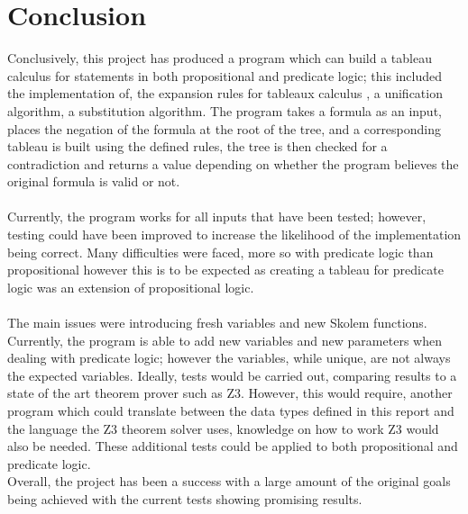 \documentclass{article}%
\begin{document}
\section{Conclusion}
Conclusively, this project has produced a program which can build a tableau calculus for statements in both propositional and predicate logic; this included the implementation of, the expansion rules for tableaux calculus \cite{fitting_2013}, a unification algorithm, a substitution algorithm. The program takes a formula as an input, places the negation of the formula at the root of the tree, and a corresponding tableau is built using the defined rules, the tree is then checked for a contradiction and returns a value depending on whether the program believes the original formula is valid or not. \\\\Currently, the program works for all inputs that have been tested; however, testing could have been improved to increase the likelihood of the implementation being correct. Many difficulties were faced, more so with predicate logic than propositional however this is to be expected as creating a tableau for predicate logic was an extension of propositional logic. \\\\
The main issues were introducing fresh variables and new Skolem functions. 
Currently, the program is able to add new variables and new parameters when dealing with predicate logic; however the variables, while unique, are not always the expected variables. Ideally,  tests would be carried out, comparing results to a state of the art theorem prover such as Z3. However, this would require, another program which could translate between the data types defined in this report and the language the Z3 theorem solver uses, knowledge on how to work Z3 would also be needed. These additional tests could be applied to both propositional and predicate logic. \\
Overall, the project has been a success with a large amount of the original goals being achieved with the current tests showing promising results.
\end{document}
